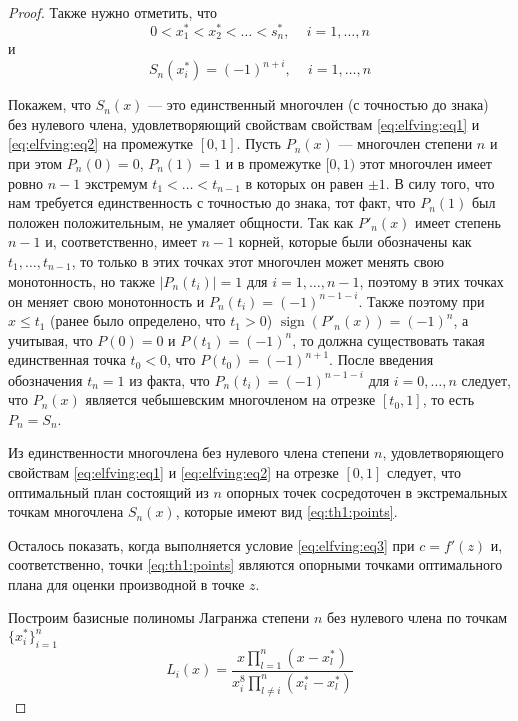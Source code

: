 \documentclass[specialist,
               substylefile = spbu.rtx,
               subf,href,colorlinks=true, 12pt]{disser}
\theoremstyle{definition}
\DeclareMathOperator*{\sign}{sign}
\newcommand\abs[1]{\left\lvert#1\right\rvert}
\begin{document}
\begin{proof}
	Также нужно отметить, что
	\begin{equation*}
		0 < x_1^* < x_2^* < \ldots < s_n^* , \, \quad i = 1, \ldots, n 
	\end{equation*}
	и
	\begin{equation*}
		S_n(x_i^*) = (-1)^{n + i} , \, \quad i = 1, \ldots, n 
	\end{equation*}
	
	Покажем, что $S_n(x)$ --- это единственный многочлен (с точностью до знака) без нулевого члена, удовлетворяющий свойствам свойствам \eqref{eq:elfving:eq1} и \eqref{eq:elfving:eq2} на промежутке $[0, 1]$. Пусть $P_n(x)$ --- многочлен степени $n$ и при этом $P_n(0) = 0$, $P_n(1) = 1$ и в промежутке $[0, 1)$ этот многочлен имеет ровно $n-1$ экстремум $t_1 < \ldots < t_{n-1}$ в которых он равен $\pm 1$. В силу того, что нам требуется единственность с точностью до знака, тот факт, что $P_n(1)$ был положен положительным, не умаляет общности. Так как $P'_n(x)$ имеет степень $n-1$ и, соответственно, имеет $n-1$ корней, которые были обозначены как $t_1, \ldots, t_{n-1}$, то только в этих точках этот многочлен может менять свою монотонность, но также $\abs{P_n(t_i)} = 1$ для $i = 1, \dots, n-1$, поэтому в этих точках он меняет свою монотонность и $P_n(t_i) = (-1)^{n-1-i}$. Также поэтому при $x \leqslant t_1$ (ранее было определено, что $t_1 > 0$) $\sign(P'_n(x)) = (-1)^n$, а учитывая, что $P(0) = 0$ и $P(t_1) = (-1)^n$, то должна существовать такая единственная точка $t_0 < 0$, что $P(t_0) = (-1)^{n+1}$. После введения обозначения $t_n = 1$ из факта, что $P_n(t_i) = (-1)^{n-1-i}$ для $i = 0, \ldots, n$ следует, что $P_n(x)$ является чебышевским многочленом на отрезке $[t_0, 1]$, то есть $P_n = S_n$.
	
	Из единственности многочлена без нулевого члена степени $n$, удовлетворяющего свойствам \eqref{eq:elfving:eq1} и \eqref{eq:elfving:eq2} на отрезке $[0, 1]$ следует, что оптимальный план состоящий из $n$ опорных точек сосредоточен в экстремальных точкам многочлена $S_n(x)$, которые имеют вид \eqref{eq:th1:points}.
	
	Осталось показать, когда выполняется условие \eqref{eq:elfving:eq3} при $c = f'(z)$ и, соответственно, точки \eqref{eq:th1:points} являются опорными точками оптимального плана для оценки производной в точке $z$.

	Построим базисные полиномы Лагранжа степени $n$ без нулевого члена по точкам $\{x_i^*\}_{i=1}^n$
	\begin{equation*}
		L_{i}(x) = \frac{x \prod_{l=1}^n (x - x_l^*)}{x_i^8 \prod_{l \neq i}^n (x_i^* - x_l^*)}
	\end{equation*}	
	

\end{proof}
\end{document}

